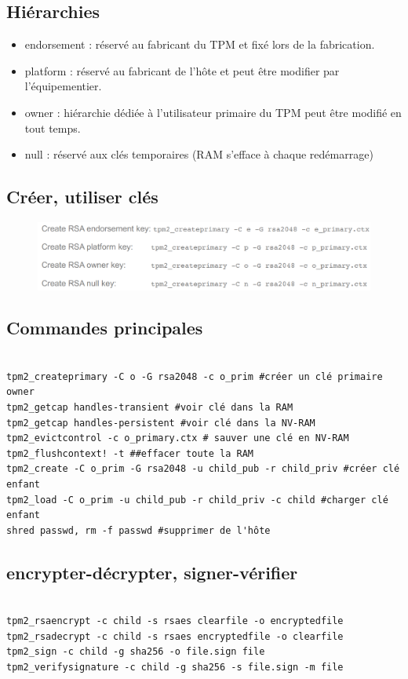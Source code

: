 \documentclass[resume]{subfiles}
\begin{document}
\subsection{Hiérarchies}
\begin{itemize}
\item endorsement : réservé au fabricant du TPM et fixé lors de la fabrication.
\item platform : réservé au fabricant de l'hôte et peut être modifier par l'équipementier.
\item owner : hiérarchie dédiée à l'utilisateur primaire du TPM peut être modifié en tout temps.
\item null : réservé aux clés temporaires (RAM s'efface à chaque redémarrage)
\end{itemize}

\subsection{Créer, utiliser clés}

\begin{figure}[H]
    \centering
    \includegraphics[width=\columnwidth]{Figures/TPM/createKey.png}
\end{figure}

\subsection{Commandes principales}
\begin{lstlisting}[style=bash]

tpm2_createprimary -C o -G rsa2048 -c o_prim #créer un clé primaire owner
tpm2_getcap handles-transient #voir clé dans la RAM
tpm2_getcap handles-persistent #voir clé dans la NV-RAM
tpm2_evictcontrol -c o_primary.ctx # sauver une clé en NV-RAM
tpm2_flushcontext! -t ##effacer toute la RAM
tpm2_create -C o_prim -G rsa2048 -u child_pub -r child_priv #créer clé enfant
tpm2_load -C o_prim -u child_pub -r child_priv -c child #charger clé enfant
shred passwd, rm -f passwd #supprimer de l'hôte

\end{lstlisting}

\subsection{encrypter-décrypter, signer-vérifier}
\begin{lstlisting}[style=bash]

tpm2_rsaencrypt -c child -s rsaes clearfile -o encryptedfile
tpm2_rsadecrypt -c child -s rsaes encryptedfile -o clearfile
tpm2_sign -c child -g sha256 -o file.sign file
tpm2_verifysignature -c child -g sha256 -s file.sign -m file
\end{lstlisting}
\end{document}
